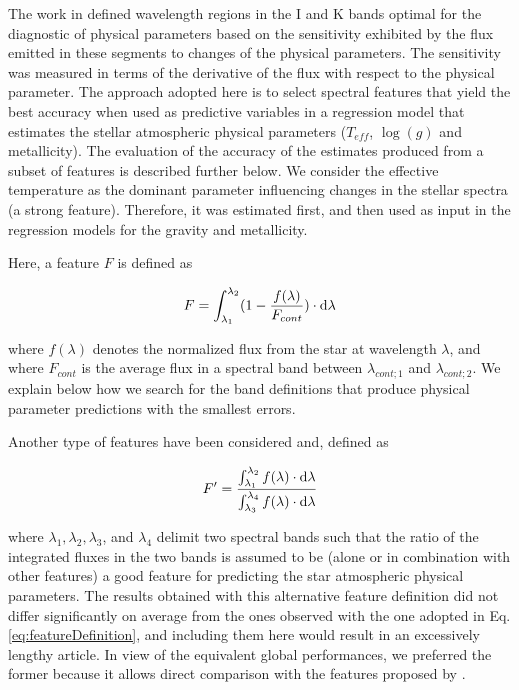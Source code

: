 The work in \cite{cesetti} defined wavelength regions in the I and K
bands optimal for the diagnostic of physical parameters based on the
sensitivity exhibited by the flux emitted in these segments to changes
of the physical parameters. The sensitivity was measured in terms of
the derivative of the flux with respect to the physical parameter. The
approach adopted here is to select spectral features that yield the
best accuracy when used as predictive variables in a regression model
that estimates the stellar atmospheric physical parameters ($T_{eff}$,
$\log(g)$ and metallicity). The evaluation of the accuracy of the
estimates produced from a subset of features is described further
below. 
We consider the effective temperature as the dominant parameter
influencing changes in the stellar spectra (a strong feature). Therefore,
it was estimated first, and then used as input in the regression
models for the gravity and metallicity.

Here, a feature $F$ is defined as

\begin{equation}\label{eq:featureDefinition}
  F = \int_{\lambda_{1}}^{\lambda_{2}} (1-\frac{f(\lambda)}{F_{cont}}) \cdot {\rm d}{\lambda}
\end{equation}

\zeroindent{}
where $f(\lambda)$ denotes the normalized flux from the star at
wavelength $\lambda$, and where $F_{cont}$ is the average flux in a
spectral band between $\lambda_{cont;1}$ and $\lambda_{cont;2}$. We
explain below how we search for the band definitions that produce
physical parameter predictions with the smallest errors.

Another type of features have been considered and, defined as

\begin{equation}\label{eq:feature2}
  F' = \frac{ \int_{\lambda_{1}}^{\lambda_{2}}f(\lambda) \cdot {\rm d}{\lambda}}
               {\int_{\lambda_{3}}^{\lambda_{4}} f(\lambda) \cdot {\rm d}{\lambda}} 
\end{equation}

\zeroindent{}
where $\lambda_1, \lambda_2, \lambda_3$, and $\lambda_4$ delimit two
spectral bands such that the ratio of the integrated fluxes in the two
bands is assumed to be (alone or in combination with other features) a
good feature for predicting the star atmospheric physical
parameters. The results obtained with this alternative feature
definition did not differ significantly on average from the ones
observed with the one adopted in Eq. \ref{eq:featureDefinition}, and
including them here would result in an excessively lengthy article. In
view of the equivalent global performances, we preferred the former
because it allows direct comparison with the features proposed
by \cite{cesetti}.


